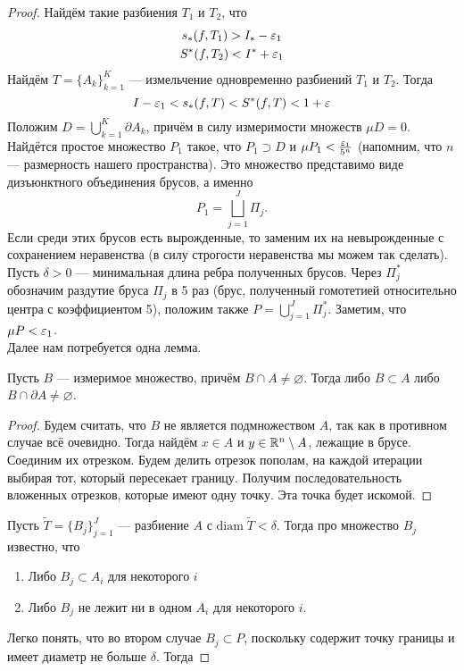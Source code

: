 \begin{proof}
    Найдём такие разбиения $T_1$ и $T_2$, что 
    \begin{gather}
        s_*(f, T_1) > I_* - \varepsilon_1\\
        S^*(f, T_2) < I^* + \varepsilon_1
    \end{gather}
    Найдём $T = \{A_k\}_{k =1}^{K}$ --- измельчение одновременно разбиений $T_1$ и $T_2$. Тогда
    $$
        I - \varepsilon_1 < s_*(f, T) < S^*(f, T) < 1 + \varepsilon
    $$
    Положим $D = \bigcup\limits_{k=1}^K \partial A_k$, причём в силу измеримости множеств $\mu D =0$. Найдётся простое множество $P_1$ такое, что $P_1 \supset D$ и $\mu P_1 < \frac{\varepsilon_1}{5^n}$ (напомним, что $n$ --- размерность нашего пространства). Это множество представимо виде дизъюнктного объединения брусов, а именно
    \[
        P_1 = \bigsqcup\limits_{j=1}^J \Pi_j.
    \]
    Если среди этих брусов есть вырожденные, то заменим их на невырожденные с сохранением неравенства (в силу строгости неравенства мы можем так сделать). Пусть $\delta > 0$ --- минимальная длина ребра полученных брусов. Через $\Pi_j^*$ обозначим раздутие бруса $\Pi_j$ в 5 раз (брус, полученный гомотетией относительно центра с коэффициентом 5), положим также $P = \bigcup\limits_{j=1}^J \Pi_j^*$. Заметим, что $\mu P < \varepsilon_1$.\\
    Далее нам потребуется одна лемма.
    \begin{Lemma}
        Пусть $B$ --- измеримое множество, причём $B \cap A \neq \varnothing$. Тогда либо $B \subset A$ либо $B \cap \partial A \neq \varnothing$.
    \end{Lemma}
    \begin{proof}
    Будем считать, что $B$ не является подмножеством $A$, так как в противном случае всё очевидно. Тогда найдём $x \in A$ и $y \in \mathbb{R}^n\setminus A$, лежащие в брусе. Соединим их отрезком. Будем делить отрезок пополам, на каждой итерации выбирая тот, который пересекает границу. Получим последовательность вложенных отрезков, которые имеют одну точку. Эта точка будет искомой.
    \end{proof}
    Пусть $\widetilde{T} = \{B_j\}_{j=1}^{J}$ --- разбиение $A$ с $\mathrm{diam}\; \widetilde T < \delta$. Тогда про множество $B_j$ известно, что
    \begin{enumerate}
        \item Либо $B_j \subset A_i$ для некоторого $i$
        \item Либо $B_j$ не лежит ни в одном $A_i$ для некоторого $i$.
    \end{enumerate}
    Легко понять, что во втором случае $B_j \subset P$, поскольку содержит точку границы и имеет диаметр не больше $\delta$. Тогда

\end{proof}
